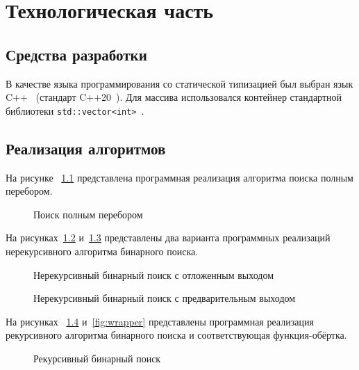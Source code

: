 \chapter{Технологическая часть}

\section{Средства разработки}
В качестве языка программирования со статической типизацией был выбран язык C++~\cite{stroustrup} (стандарт C++20~\cite{iso_cpp}). Для массива использовался контейнер стандартной библиотеки \texttt{std::vector<int>}~\cite{stroustrup}.

\section{Реализация алгоритмов}

На рисунке ~\ref{fig:brute_force_search} представлена программная реализация алгоритма поиска полным перебором.
\begin{figure}[H]
	\centering
		
		\caption{Поиск полным перебором}
		\label{fig:brute_force_search}
\end{figure}

На рисунках~\ref{fig:bin_search_1} и~\ref{fig:bin_search_2} представлены два варианта программных реализаций нерекурсивного алгоритма бинарного поиска.
\begin{figure}[H]
	\centering
		
		\caption{Нерекурсивный бинарный поиск с отложенным выходом}
		\label{fig:bin_search_1}
\end{figure}

\begin{figure}[H]
	\centering
		
		\caption{Нерекурсивный бинарный поиск с предварительным выходом}
		\label{fig:bin_search_2}
\end{figure}

На рисунках ~\ref{fig:bin_search_r} и~\ref{fig:wrapper} представлены программная реализация рекурсивного алгоритма бинарного поиска и соответствующая функция-обёртка.
\begin{figure}[H]
	\centering
		
		\caption{Рекурсивный бинарный поиск}
		\label{fig:bin_search_r}
\end{figure}

